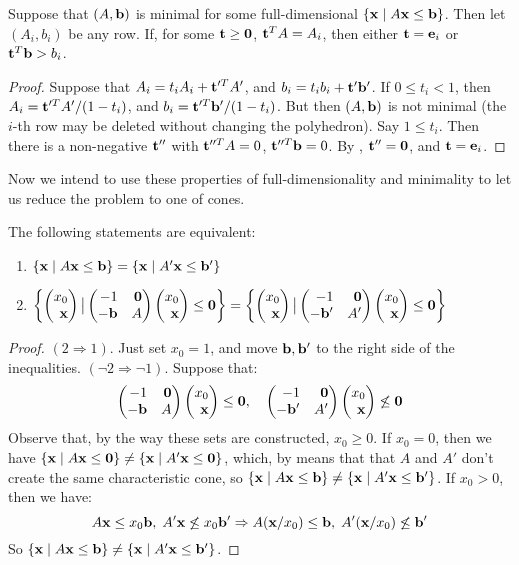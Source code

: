 \begin{Prop}\label{ab_is_minimal}
	Suppose that $(A,\mathbf{b})$ is minimal for some full-dimensional $\left\{\mathbf{x}\;|\; A\mathbf{x}\leq \mathbf{b}\right\}$.  Then let $(A_i,b_i)$ be any row.  If, for some $\mathbf{t}\geq\mathbf{0}$, $\mathbf{t}^TA = A_i$, then either $\mathbf{t}=\mathbf{e}_i$ or $\mathbf{t}^T\mathbf{b} > b_i$.
\end{Prop}

\begin{proof}
	Suppose that $A_i = t_i A_i + \mathbf{t}'^T A'$, and $b_i = t_i b_i + \mathbf{t}'\mathbf{b}'$.  If $0 \leq t_i < 1$, then $A_i = \mathbf{t}'^T A'/(1-t_i)$, and $b_i = \mathbf{t}'^T \mathbf{b}'/(1-t_i)$.  But then $(A,\mathbf{b})$ is not minimal (the $i$-th row may be deleted without changing the polyhedron).  Say $1\leq t_i$.  Then there is a non-negative $\mathbf{t}''$ with $\mathbf{t}''^T A = 0$, $\mathbf{t}''^T\mathbf{b} = 0$.  By , $\mathbf{t}'' = \mathbf{0}$, and $\mathbf{t} = \mathbf{e}_i$.
\end{proof}

Now we intend to use these properties of full-dimensionality and minimality to let us reduce the problem to one of cones.

\begin{Prop}\label{homogenization_cone}
	The following statements are equivalent:
	\begin{enumerate}
		\item $\left\{\mathbf{x}\;|\; A\mathbf{x}\leq \mathbf{b}\right\} = \left\{\mathbf{x}\;|\; A'\mathbf{x}\leq \mathbf{b}'\right\}$
		\item $\set{\xx \big| \pmb -1 & \0 \\ -\b & A \pme \xx \leq \0} =
			      \set{\xx \big| \pmb -1 & \0 \\ -\b' & A' \pme \xx \leq \0}$
	\end{enumerate}
\end{Prop}

\begin{proof}
	$(2 \Rightarrow 1)$.  Just set $x_0 = 1$, and move $\mathbf{b},\mathbf{b}'$ to the right side of the inequalities.
	$(\neg 2 \Rightarrow \neg 1)$.  Suppose that:
	\[ \pmb -1 & \0 \\ -\b & A \pme \xx \leq \0,\quad
		\pmb -1 & \0 \\ -\b' & A' \pme \xx \not\leq \0 \]
	Observe that, by the way these sets are constructed, $x_0 \geq 0$.  If $x_0 = 0$, then we have $\left\{\mathbf{x}\;|\; A\mathbf{x}\leq\mathbf{0}\right\} \neq \left\{\mathbf{x}\;|\; A'\mathbf{x}\leq\mathbf{0}\right\}$, which, by  means that that $A$ and $A'$ don't create the same characteristic cone, so $\left\{\mathbf{x}\;|\; A\mathbf{x}\leq \mathbf{b}\right\} \neq \left\{\mathbf{x}\;|\; A'\mathbf{x}\leq \mathbf{b}'\right\}$.  If $x_0 > 0$, then we have:
	\[ A\mathbf{x} \leq x_0\mathbf{b},\;A'\mathbf{x}\not\leq x_0\mathbf{b}' \Rightarrow A(\mathbf{x}/x_0)\leq\mathbf{b},\;A'(\mathbf{x}/x_0)\not\leq\mathbf{b}' \]
	So $\left\{\mathbf{x}\;|\; A\mathbf{x}\leq \mathbf{b}\right\} \neq \left\{\mathbf{x}\;|\; A'\mathbf{x}\leq \mathbf{b}'\right\}$.
\end{proof}

